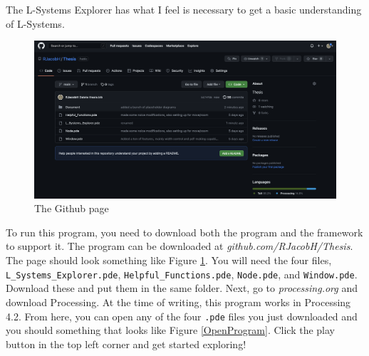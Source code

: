 \documentclass[12pt,twoside]{reedthesis}
\newcommand{\code}[1]{\texttt{#1}}
\begin{document}
	The L-Systems Explorer has what I feel is necessary to get a basic understanding of L-Systems.
	
	
	\begin{figure}[h]
	\centering
	\includegraphics[scale=0.3]{Images/Github}
	\caption{The Github page}
	\label {Github}
	\end{figure}
	
	To run this program, you need to download both the program and the framework to support it. The program can be downloaded at \textit{github.com/RJacobH/Thesis}. The page should look something like Figure \ref{Github}. You will need the four files, \code{L\_Systems\_Explorer.pde}, \code{Helpful\_Functions.pde}, \code{Node.pde}, and \code{Window.pde}. Download these and put them in the same folder. Next, go to \textit{processing.org} and download Processing. At the time of writing, this program works in Processing 4.2. From here, you can open any of the four \code{.pde} files you just downloaded and you should something that looks like Figure \ref{OpenProgram}. Click the play button in the top left corner and get started exploring!\\
	
	
\end{document}
